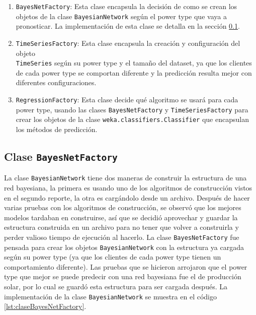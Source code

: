 \begin{enumerate}
	\item \texttt{BayesNetFactory}: Esta clase encapsula la decisión de como se crean los objetos de la clase \texttt{BayesianNetwork} según el power type que vaya a pronosticar. La implementación de esta clase se detalla en la sección \ref{subsec:claseBayesNetFactory}.
	
	\item \texttt{TimeSeriesFactory}: Esta clase encapsula la creación y configuración del objeto \\\texttt{TimeSeries} según su power type y el tamaño del dataset, ya que los clientes de cada power type se comportan diferente y la predicción resulta mejor con diferentes configuraciones.
	
	\item \texttt{RegressionFactory}: Esta clase decide qué algoritmo se usará para cada power type, usando las clases \texttt{BayesNetFactory} y \texttt{TimeSeriesFactory} para crear los objetos de la clase \texttt{weka.classifiers.Classifier} que encapsulan los métodos de predicción.
\end{enumerate} %

\subsection{Clase \texttt{BayesNetFactory}} \label{subsec:claseBayesNetFactory}
La clase \texttt{BayesianNetwork} tiene dos maneras de construir la estructura de una red bayesiana, la primera es usando uno de los algoritmos de construcción vistos en el segundo reporte, la otra es cargándolo desde un archivo. Después de hacer varias pruebas con los algoritmos de construcción, se observó que los mejores modelos tardaban en construirse, así que se decidió aprovechar y guardar la estructura construida en un archivo para no tener que volver a construirla y perder valioso tiempo de ejecución al hacerlo. La clase \texttt{BayesNetFactory} fue pensada para crear los objetos \texttt{BayesianNetwork} con la estructura ya cargada según su power type (ya que los clientes de cada power type tienen un comportamiento diferente). Las pruebas que se hicieron arrojaron que el power type que mejor se puede predecir con una red bayesiana fue el de producción solar, por lo cual se guardó esta estructura para ser cargada después.
La implementación de la clase \texttt{BayesianNetwork} se muestra en el código \ref{lst:claseBayesNetFactory}.


